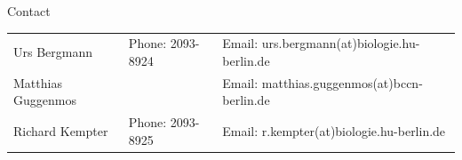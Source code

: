 \documentclass[12pt]{article}
\begin{document}
\begin{enumerate}
% 
% 
% 
% 
\end{enumerate}

\vfill
\centerline{\CAP Contact}
\CAP

\begin{tabular}{lll}
Urs Bergmann & Phone: 2093-8924 & Email:
urs.bergmann(at)biologie.hu-berlin.de \\
Matthias Guggenmos & & Email: matthias.guggenmos(at)bccn-berlin.de \\
Richard Kempter \hfill & Phone: 2093-8925 \hfill & Email:
r.kempter(at)biologie.hu-berlin.de \\
\end{tabular}
\end{document}
